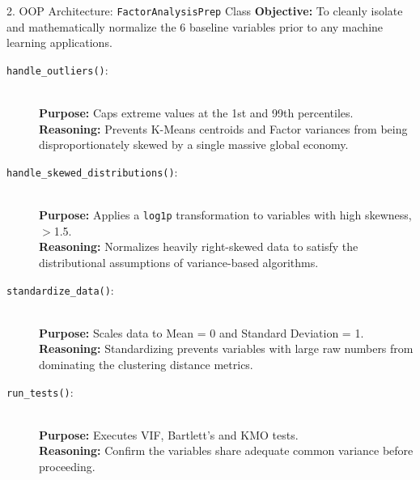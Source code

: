 \documentclass[aspectratio=169]{beamer}
\begin{document}
\begin{frame}{2. OOP Architecture: \texttt{FactorAnalysisPrep} Class}
  \footnotesize 
  \textbf{Objective:} To cleanly isolate and mathematically normalize the 6 baseline variables prior to any machine learning applications.
  \vspace{0.1cm}

  \begin{description}
      \item[\texttt{handle\_outliers()}:] \hfill \\
      \textbf{Purpose:} Caps extreme values at the 1st and 99th percentiles. \\
      \textbf{Reasoning:} Prevents K-Means centroids and Factor variances from being disproportionately skewed by a single massive global economy.
      
      \item[\texttt{handle\_skewed\_distributions()}:] \hfill \\
      \textbf{Purpose:} Applies a \texttt{log1p} transformation to variables with high skewness, $>$1.5. \\
      \textbf{Reasoning:} Normalizes heavily right-skewed data to satisfy the distributional assumptions of variance-based algorithms.
      
      \item[\texttt{standardize\_data()}:] \hfill \\
      \textbf{Purpose:} Scales data to Mean = 0 and Standard Deviation = 1. \\
      \textbf{Reasoning:} Standardizing prevents variables with large raw numbers from dominating the clustering distance metrics.

      \item[\texttt{run\_tests()}:] \hfill \\
      \textbf{Purpose:} Executes VIF, Bartlett's and KMO tests. \\
      \textbf{Reasoning:} Confirm the variables share adequate common variance before proceeding.
  \end{description}
\end{frame}
\end{document}
